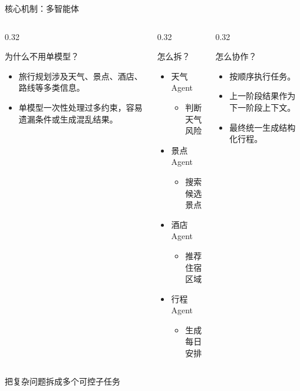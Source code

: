 \documentclass[aspectratio=169]{beamer}
\begin{document}
\begin{frame}{核心机制：多智能体}
  \begin{columns}[T,onlytextwidth]
    \begin{column}{0.32\linewidth}
      \begin{block}{为什么不用单模型？}
        \begin{itemize}
          \item 旅行规划涉及天气、景点、酒店、路线等多类信息。
          \item 单模型一次性处理过多约束，容易遗漏条件或生成混乱结果。
        \end{itemize}
      \end{block}
    \end{column}
    \begin{column}{0.32\linewidth}
      \begin{block}{怎么拆？}
        \begin{itemize}
          \item 天气 Agent
            \begin{itemize}
              \item 判断天气风险
            \end{itemize}
          \item 景点 Agent
            \begin{itemize}
              \item 搜索候选景点
            \end{itemize}
          \item 酒店 Agent
            \begin{itemize}
              \item 推荐住宿区域
            \end{itemize}
          \item 行程 Agent
            \begin{itemize}
              \item 生成每日安排
            \end{itemize}
        \end{itemize}
      \end{block}
    \end{column}
    \begin{column}{0.32\linewidth}
      \begin{block}{怎么协作？}
        \begin{itemize}
          \item 按顺序执行任务。
          \item 上一阶段结果作为下一阶段上下文。
          \item 最终统一生成结构化行程。
        \end{itemize}
      \end{block}
    \end{column}
  \end{columns}

  \vspace{0.8em}
  \begin{center}
    \colorbox{softpurple}{\strut\hspace{1em}把复杂问题拆成多个可控子任务\hspace{1em}}
  \end{center}
\end{frame}
\end{document}
